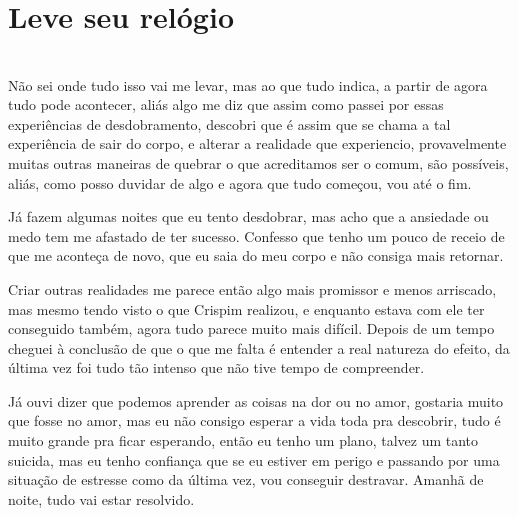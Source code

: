 \newpage


\ifdefined\useChapters
\chapter{Leve seu relógio}
\else
\chapter{}
\fi


Não sei onde tudo isso vai me levar, mas ao que tudo indica, a partir de agora tudo pode acontecer, aliás algo me diz que assim como passei por essas experiências de desdobramento, descobri que é assim que se chama a tal experiência de sair do corpo, e alterar a realidade que experiencio, provavelmente muitas outras maneiras de quebrar o que acreditamos ser o comum, são possíveis, aliás, como posso duvidar de algo e agora que tudo começou, vou até o fim.

Já fazem algumas noites que eu tento desdobrar, mas acho que a ansiedade ou medo tem me afastado de ter sucesso. Confesso que tenho um pouco de receio de que me aconteça de novo, que eu saia do meu corpo e não consiga mais retornar. 

Criar outras realidades me parece então algo mais promissor e menos arriscado, mas mesmo tendo visto o que Crispim realizou, e enquanto estava com ele ter conseguido também, agora tudo parece muito mais difícil. Depois de um tempo cheguei à conclusão de que o que me falta é entender a real natureza do efeito, da última vez foi tudo tão intenso que não tive tempo de compreender.

Já ouvi dizer que podemos aprender as coisas na dor ou no amor, gostaria muito que fosse no amor, mas eu não consigo esperar a vida toda pra descobrir, tudo é muito grande pra ficar esperando, então eu tenho um plano, talvez um tanto suicida, mas eu tenho confiança que se eu estiver em perigo e passando por uma situação de estresse como da última vez, vou conseguir destravar. Amanhã de noite, tudo vai estar resolvido.

